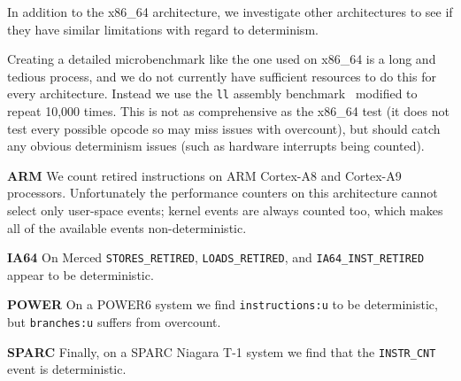 In addition to the x86\_64 architecture, we investigate other 
architectures to see 
if they have similar limitations with regard to determinism.

Creating a detailed microbenchmark like the one used on x86\_64
is a long and tedious process, and
we do not currently have sufficient resources to 
do this for every architecture.  
Instead we use the {\tt ll} assembly benchmark~\cite{weaver+:iccd09}
modified to repeat 10,000 times.  
This is not as comprehensive 
as the x86\_64 test (it does not test every possible opcode so 
may miss issues with overcount), 
but should catch any obvious determinism issues (such
as hardware interrupts being counted).

{\bf ARM}
We count retired instructions on ARM Cortex-A8 and Cortex-A9 processors.  
Unfortunately the performance counters on this architecture
cannot select only user-space events; kernel events are always counted too, 
which makes all of the available events non-deterministic.

{\bf IA64}
On Merced {\tt STORES\_RETIRED}, {\tt LOADS\_RETIRED}, and 
{\tt IA64\_INST\_RETIRED} appear to be deterministic.

{\bf POWER}
On a POWER6 system we find {\tt instructions:u} to be 
deterministic, but {\tt branches:u} suffers from
overcount.

{\bf SPARC}
Finally, on a SPARC Niagara T-1 system we find that the {\tt INSTR\_CNT} 
event is deterministic.
